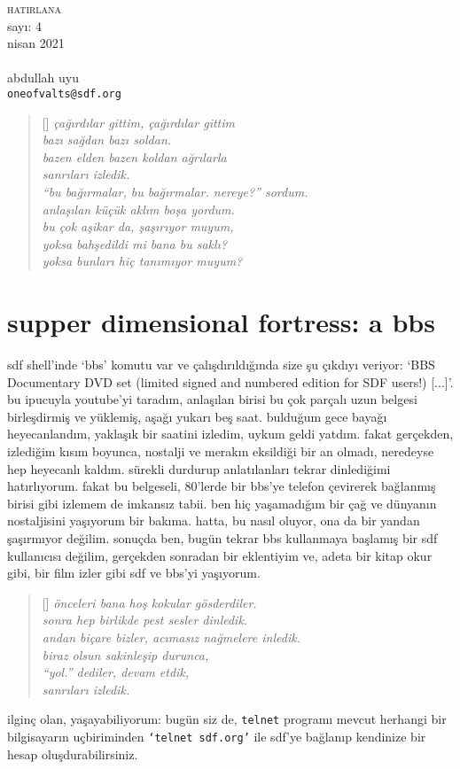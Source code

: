 \documentclass[a4paper, twocolumn, openright]{memoir}
\begin{document}
\thispagestyle{plain}
\noindent
{\HUGE\textsc{hatirlana}\\\small{}sayı: 4\\nisan 2021}\\\\
{\small{}abdullah uyu\\\texttt{oneofvalts@sdf.org}}
\bigskip
{}
\begin{verse}[\versewidth]
\itshape{}
çağırdılar gittim, çağırdılar gittim\\
bazı sağdan bazı soldan.\\
bazen elden bazen koldan ağrılarla\\
sanrıları izledik.\\
``bu bağırmalar, bu bağırmalar. nereye?'' sordum.\\
anlaşılan küçük aklım boşa yordum.\\
bu çok aşikar da, şaşırıyor muyum,\\
yoksa bahşedildi mi bana bu saklı?\\
yoksa bunları hiç tanımıyor muyum?\\
\end{verse}
\section{supper dimensional fortress: a bbs}
sdf shell'inde {\ttfamily `bbs'} komutu var ve çalışdırıldığında size şu
çıkdıyı veriyor: {\ttfamily `BBS  Documentary   DVD  set  (limited signed
and  numbered edition  for SDF users!) [...]'}. bu ipucuyla youtube'yi
taradım, anlaşılan birisi bu çok parçalı uzun belgesi birleşdirmiş ve
yüklemiş, aşağı yukarı beş saat. bulduğum gece bayağı heyecanlandım,
yaklaşık bir saatini izledim, uykum geldi yatdım. fakat gerçekden,
izlediğim kısım boyunca, nostalji ve merakın eksildiği bir an olmadı,
neredeyse hep heyecanlı kaldım. sürekli durdurup anlatılanları tekrar
dinlediğimi hatırlıyorum. fakat bu belgeseli, 80'lerde bir bbs'ye telefon
çevirerek bağlanmış birisi gibi izlemem de imkansız tabii. ben hiç
yaşamadığım bir çağ ve dünyanın nostaljisini yaşıyorum bir bakıma.
hatta, bu nasıl oluyor, ona da bir yandan şaşırmıyor değilim. sonuçda
ben, bugün tekrar bbs kullanmaya başlamış bir sdf kullanıcısı değilim,
gerçekden sonradan bir eklentiyim ve, adeta bir kitap okur gibi, bir film
izler gibi sdf ve bbs'yi yaşıyorum.
\begin{verse}[\versewidth]
\itshape{}
önceleri bana hoş kokular gösderdiler.\\
sonra hep birlikde pest sesler dinledik.\\
andan biçare bizler, acımasız nağmelere inledik.\\
biraz olsun sakinleşip durunca,\\
``yol.'' dediler, devam etdik,\\
sanrıları izledik.\\
\end{verse}
ilginç olan, yaşayabiliyorum: bugün
siz de, \texttt{telnet} programı mevcut herhangi bir bilgisayarın
uçbiriminden \texttt{`telnet sdf.org'} ile sdf'ye bağlanıp kendinize bir
hesap oluşdurabilirsiniz.
\end{document}
